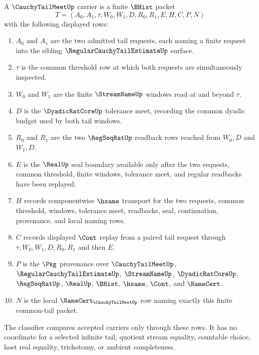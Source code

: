 \begin{definition}
\label{def:cauchy-tail-meet-carrier}
A $\CauchyTailMeetUp$ carrier is a finite $\BHist$ packet
$$
T=(A_0,A_1,\tau,W_0,W_1,D,R_0,R_1,E,H,C,P,N)
$$
with the following displayed rows:
\begin{enumerate}
\item $A_0$ and $A_1$ are the two admitted tail requests, each naming a finite request into the sibling $\RegularCauchyTailEstimateUp$ surface.
\item $\tau$ is the common threshold row at which both requests are simultaneously inspected.
\item $W_0$ and $W_1$ are the finite $\StreamNameUp$ windows read at and beyond $\tau$.
\item $D$ is the $\DyadicRatCoreUp$ tolerance meet, recording the common dyadic budget used by both tail windows.
\item $R_0$ and $R_1$ are the two $\RegSeqRatUp$ readback rows reached from $W_0,D$ and $W_1,D$.
\item $E$ is the $\RealUp$ seal boundary available only after the two requests, common threshold, finite windows, tolerance meet, and regular readbacks have been replayed.
\item $H$ records componentwise $\hsame$ transport for the two requests, common threshold, windows, tolerance meet, readbacks, seal, continuation, provenance, and local naming rows.
\item $C$ records displayed $\Cont$ replay from a paired tail request through $\tau,W_0,W_1,D,R_0,R_1$ and then $E$.
\item $P$ is the $\Pkg$ provenance over $\CauchyTailMeetUp$, $\RegularCauchyTailEstimateUp$, $\StreamNameUp$, $\DyadicRatCoreUp$, $\RegSeqRatUp$, $\RealUp$, $\BHist$, $\hsame$, $\Cont$, and $\NameCert$.
\item $N$ is the local $\NameCert_{\CauchyTailMeetUp}$ row naming exactly this finite common-tail packet.
\end{enumerate}
The classifier compares accepted carriers only through these rows. It has no coordinate for a selected infinite tail, quotient stream equality, countable choice, host real equality, trichotomy, or ambient completeness.
\end{definition}

